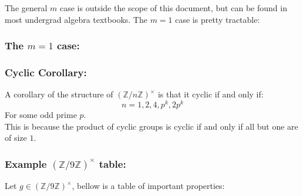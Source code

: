 The general $m$ case is outside the scope of this document,
but can be found in most undergrad algebra textbooks.
The $m = 1$ case is pretty tractable:

\subsubsection{The $m = 1$ case:}

\subsubsection{Cyclic Corollary:}
\label{appx:cycle-multiplicative-group}
A corollary of the structure of $(\mathbb{Z}/n\mathbb{Z})^\times$ is that it cyclic if and only if:
\[n = 1,2,4,p^k,2p^k\]
For some odd prime $p$.
\\

This is because the product of cyclic groups is cyclic if and only if all but one are of size $1$.

\subsubsection{Example $(\mathbb{Z}/9\mathbb{Z})^\times$ table:}
Let $g\in(\mathbb{Z}/9\mathbb{Z})^\times$,
bellow is a table of important properties:

